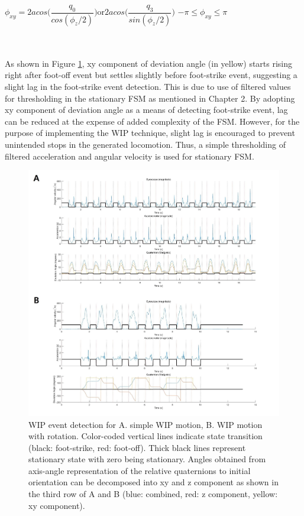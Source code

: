 \centerline{$\phi_{xy} = 2acos\Big(\dfrac{q_{0}}{cos(\phi_{z}/2)}\Big)$\indent or\indent $2acos\Big(\dfrac{q_{3}}{sin(\phi_{z}/2)}\Big)$ \indent $-\pi\leq \phi_{xy}\leq\pi$}
\\\\
As shown in Figure \ref{fig:wip_quaternion_decomposition}, xy component of deviation angle (in yellow) starts rising right after foot-off event but settles slightly before foot-strike event, suggesting a slight lag in the foot-strike event detection. This is due to use of filtered values for thresholding in the stationary FSM as mentioned in Chapter 2. By adopting xy component of deviation angle as a means of detecting foot-strike event, lag can be reduced at the expense of added complexity of the FSM. However, for the purpose of implementing the WIP technique, slight lag is encouraged to prevent unintended stops in the generated locomotion. Thus, a simple thresholding of filtered acceleration and angular velocity is used for stationary FSM.

\newpage

\begin{figure}[th]
\captionsetup{justification=raggedright,singlelinecheck=false}
\centering
\includegraphics[width=\textwidth,height=\textheight,keepaspectratio]{Figures/wip_quaternion_decomposition.jpg}
\decoRule
\caption[WIP event detection with quaternion decomposition]{WIP event detection for A. simple WIP motion, B. WIP motion with rotation. Color-coded vertical lines indicate state transition (black: foot-strike, red: foot-off). Thick black lines represent stationary state with zero being stationary. Angles obtained from axis-angle representation of the relative quaternions to initial orientation can be decomposed into xy and z component as shown in the third row of A and B (blue: combined, red: z component, yellow: xy component).}
\label{fig:wip_quaternion_decomposition}
\end{figure}
\noindent

